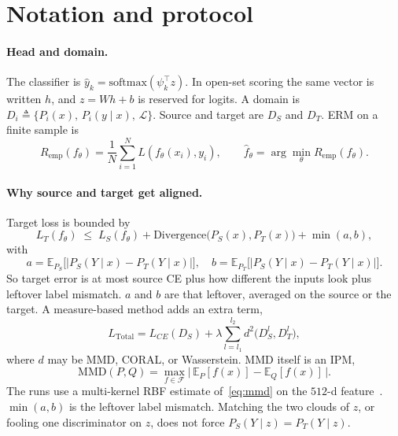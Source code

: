 \documentclass{article}
\begin{document}
\section{Notation and protocol}
\label{sec:setup}

\paragraph{Head and domain.}
The classifier is $\hat y_k=\mathrm{softmax}(\psi_k^\top z)$.
In open-set scoring the same vector is written $h$, and $z=Wh+b$ is reserved for logits.
A domain is $D_i\triangleq\{P_i(x),\,P_i(y\mid x),\,\mathcal{L}\}$.
Source and target are $D_S$ and $D_T$.
ERM on a finite sample is
\begin{equation}
  R_{\mathrm{emp}}(f_\theta)=\frac1N\sum_{i=1}^N L(f_\theta(x_i),y_i),
  \qquad
  \hat f_\theta=\arg\min_\theta R_{\mathrm{emp}}(f_\theta).
  \label{eq:erm}
\end{equation}

\paragraph{Why source and target get aligned.}
Target loss is bounded by
\begin{equation}
  L_T(f_\theta)
  \;\le\;
  L_S(f_\theta)
  +\mathrm{Divergence}\big(P_S(x),P_T(x)\big)
  +\min(a,b),
  \label{eq:da-bound}
\end{equation}
with
\begin{equation}
  a=\mathbb{E}_{P_S}\big[|P_S(Y\mid x)-P_T(Y\mid x)|\big],
  \quad
  b=\mathbb{E}_{P_T}\big[|P_S(Y\mid x)-P_T(Y\mid x)|\big].
  \label{eq:ab}
\end{equation}
So target error is at most source CE plus how different the inputs look plus leftover label mismatch.
$a$ and $b$ are that leftover, averaged on the source or the target.
A measure-based method adds an extra term,
\begin{equation}
  L_{\mathrm{Total}}
  =L_{CE}(D_S)
  +\lambda\sum_{l=l_1}^{l_2}d^2\big(D_S^l,D_T^l\big),
  \label{eq:dan}
\end{equation}
where $d$ may be MMD, CORAL, or Wasserstein.
MMD itself is an IPM,
\begin{equation}
  \mathrm{MMD}(P,Q)=\max_{f\in\mathcal{F}}\big|\,\mathbb{E}_{P}[f(x)]-\mathbb{E}_{Q}[f(x)]\,\big|.
  \label{eq:mmd}
\end{equation}
The runs use a multi-kernel RBF estimate of~\eqref{eq:mmd} on the $512$-d feature~\citep{long2015learning}.
$\min(a,b)$ is the leftover label mismatch.
Matching the two clouds of $z$, or fooling one discriminator on $z$, does not force $P_S(Y\mid z)=P_T(Y\mid z)$.
\end{document}
